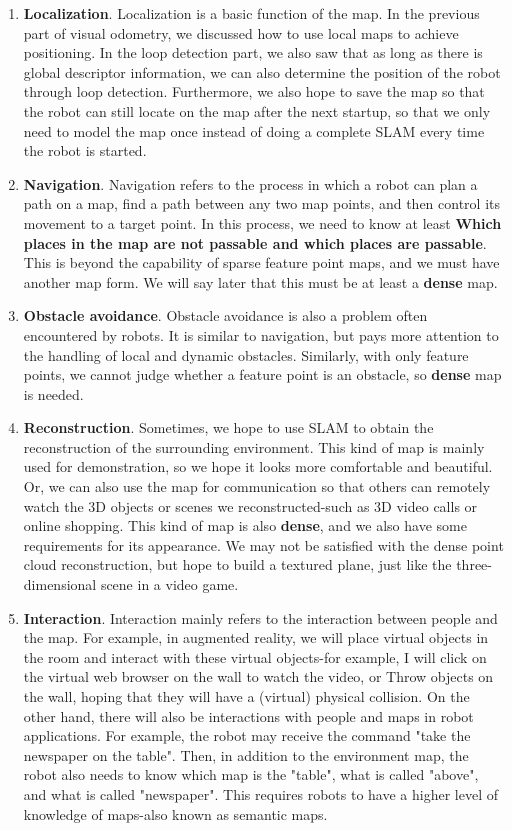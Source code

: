 \begin{enumerate}
	\item \textbf{Localization}. Localization is a basic function of the map. In the previous part of visual odometry, we discussed how to use local maps to achieve positioning. In the loop detection part, we also saw that as long as there is global descriptor information, we can also determine the position of the robot through loop detection. Furthermore, we also hope to save the map so that the robot can still locate on the map after the next startup, so that we only need to model the map once instead of doing a complete SLAM every time the robot is started.
	\item \textbf{Navigation}. Navigation refers to the process in which a robot can plan a path on a map, find a path between any two map points, and then control its movement to a target point. In this process, we need to know at least \textbf{Which places in the map are not passable and which places are passable}. This is beyond the capability of sparse feature point maps, and we must have another map form. We will say later that this must be at least a \textbf{dense} map.
	\item \textbf{Obstacle avoidance}. Obstacle avoidance is also a problem often encountered by robots. It is similar to navigation, but pays more attention to the handling of local and dynamic obstacles. Similarly, with only feature points, we cannot judge whether a feature point is an obstacle, so \textbf{dense} map is needed.
	\item \textbf{Reconstruction}. Sometimes, we hope to use SLAM to obtain the reconstruction of the surrounding environment. This kind of map is mainly used for demonstration, so we hope it looks more comfortable and beautiful. Or, we can also use the map for communication so that others can remotely watch the 3D objects or scenes we reconstructed-such as 3D video calls or online shopping. This kind of map is also \textbf{dense}, and we also have some requirements for its appearance. We may not be satisfied with the dense point cloud reconstruction, but hope to build a textured plane, just like the three-dimensional scene in a video game.
	\item \textbf{Interaction}. Interaction mainly refers to the interaction between people and the map. For example, in augmented reality, we will place virtual objects in the room and interact with these virtual objects-for example, I will click on the virtual web browser on the wall to watch the video, or Throw objects on the wall, hoping that they will have a (virtual) physical collision. On the other hand, there will also be interactions with people and maps in robot applications. For example, the robot may receive the command "take the newspaper on the table". Then, in addition to the environment map, the robot also needs to know which map is the "table", what is called "above", and what is called "newspaper". This requires robots to have a higher level of knowledge of maps-also known as semantic maps.
\end{enumerate}

